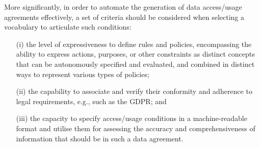 More significantly, in order to automate the generation of data access/usage agreements effectively, a set of criteria should be considered when selecting a vocabulary to articulate such conditions:
\begin{enumerate}
    \item[(i)] the level of expressiveness to define rules and policies, encompassing the ability to express actions, purposes, or other constraints as distinct concepts that can be autonomously specified and evaluated, and combined in distinct ways to represent various types of policies;
    \item[(ii)] the capability to associate and verify their conformity and adherence to legal requirements, e.g., such as the GDPR; and
    \item[(iii)] the capacity to specify access/usage conditions in a machine-readable format and utilise them for assessing the accuracy and comprehensiveness of information that should be in such a data agreement.
\end{enumerate}

